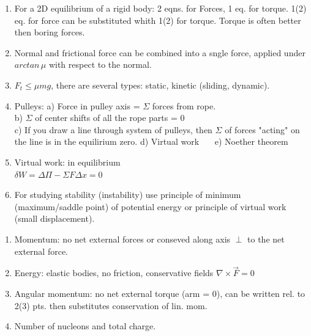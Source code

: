 \documentclass{article}
\begin{document}
\begin{multicols}{3}
    \begin{enumerate}
        \item For a 2D equilibrium of a rigid body: 2 eqns. for Forces, 1 eq. for torque. 1(2) eq. for force can be substituted whith 1(2) for torque. Torque is often better then boring forces.
        \item Normal and frictional force can be combined into a sngle force, applied under $arctan\,\mu$ with respect to the normal.
        \item $F_t\leq\mu mg$, there are several types: static, kinetic (sliding, dynamic).
        \item Pulleys: a) Force in pulley axis = $\Sigma$ forces from rope.\\
            b) $\Sigma$ of center shifts of all the rope parts = 0\\
            c) If you draw a line through system of pulleys, then $\Sigma$ of forces "acting" on the line is in the equilirium zero.
            d) Virtual work ~~~e) Noether theorem
        \item Virtual work: in equilibrium\\ $\delta W=\Delta \Pi-\Sigma F\Delta x =0$
        \item For studying stability (instability) use principle of minimum (maximum/saddle point) of potential energy or principle of virtual work (small displacement).
    \end{enumerate}


    \begin{enumerate}
            \item Momentum: no net external forces or conseved along axis $\perp$ to the net external force.
            \item Energy: elastic bodies, no friction, conservative fields $\nabla\times\vec F=0$
            \item Angular momentum: no net external torque (arm = 0), can be written rel. to 2(3) pts. then substitutes conservation of lin. mom.
            \item Number of nucleons and total charge.
    \end{enumerate}

    \begin{enumerate}


\end{enumerate}
\end{multicols}
\end{document}
